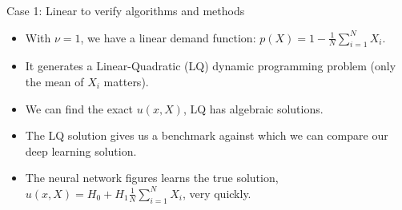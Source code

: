 \documentclass[aspectratio=169,10pt]{beamer}
\begin{document}
			
\begin{frame}{Case 1: Linear to verify algorithms and methods}
			
	\begin{itemize}
			
		\item With $\nu=1$, we have a linear demand function:  $p(X) = 1 -  \frac{1}{N}\sum_{i=1}^N X_i$.\vspace{0.1in}
			
		\item It generates a Linear-Quadratic (LQ) dynamic programming problem (only the mean of $X_i$ matters).\vspace{0.1in}
			
		\item We can find the exact $u(x, X)$, LQ has algebraic solutions.\vspace{0.1in}
			
		\item The LQ solution gives us a benchmark against which we can compare our deep learning solution.\vspace{0.1in}
			
		\item The neural network figures learns the true solution, $u(x,X)= H_0 +H_1 \frac{1}{N}\sum_{i=1}^N X_i$, very quickly. \vspace{0.1in}
			
			
			
			\end{itemize}
			
\end{frame}
			
\end{document}
